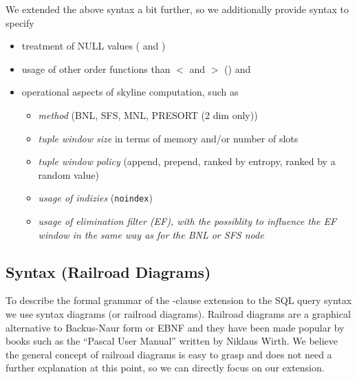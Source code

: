 We extended the above syntax a bit further, so we additionally provide syntax to specify
\begin{itemize}
\item treatment of NULL values ( and )
\item usage of other order functions than $<$ and $>$ () and
\item operational aspects of skyline computation, such as 

\begin{itemize}
\item \emph{method} (BNL, SFS, MNL, PRESORT (2 dim only))
\item \emph{tuple window size} in terms of memory and/or number of slots
\item \emph{tuple window policy} (append, prepend, ranked by entropy, ranked by a random value)
\item \emph{usage of indizies} (\texttt{noindex})
\item \emph{usage of elimination filter (EF), with the possiblity to influence the EF window in the same way as for the BNL or SFS node}
\end{itemize}

\end{itemize}

\subsection{Syntax (Railroad Diagrams)}
To describe the formal grammar of the -clause
extension to the SQL query syntax we use syntax diagrams (or railroad
diagrams). Railroad diagrams are a graphical alternative to
Backus-Naur form or EBNF and they have been made popular by books such
as the ``Pascal User Manual'' written by Niklaus Wirth. We believe the
general concept of railroad diagrams is easy to grasp and does not
need a further explanation at this point, so we can directly focus on
our  extension.


